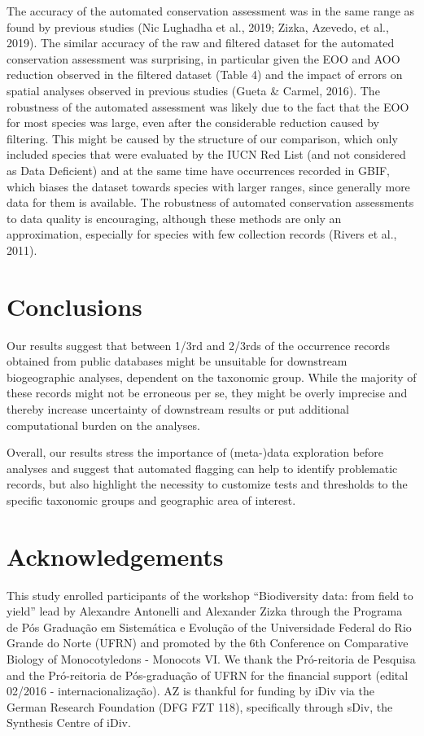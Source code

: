 \documentclass[
  12pt,
]{article}
\begin{document}
The accuracy of the automated conservation assessment was in the same range as found by previous studies (Nic Lughadha et al., 2019; Zizka, Azevedo, et al., 2019). The similar accuracy of the raw and filtered dataset for the automated conservation assessment was surprising, in particular given the EOO and AOO reduction observed in the filtered dataset (Table 4) and the impact of errors on spatial analyses observed in previous studies (Gueta \& Carmel, 2016). The robustness of the automated assessment was likely due to the fact that the EOO for most species was large, even after the considerable reduction caused by filtering. This might be caused by the structure of our comparison, which only included species that were evaluated by the IUCN Red List (and not considered as Data Deficient) and at the same time have occurrences recorded in GBIF, which biases the dataset towards species with larger ranges, since generally more data for them is available. The robustness of automated conservation assessments to data quality is encouraging, although these methods are only an approximation, especially for species with few collection records (Rivers et al., 2011).

\hypertarget{conclusions}{%
\section{Conclusions}\label{conclusions}}

Our results suggest that between 1/3rd and 2/3rds of the occurrence records obtained from public databases might be unsuitable for downstream biogeographic analyses, dependent on the taxonomic group. While the majority of these records might not be erroneous per se, they might be overly imprecise and thereby increase uncertainty of downstream results or put additional computational burden on the analyses.

Overall, our results stress the importance of (meta-)data exploration before analyses and suggest that automated flagging can help to identify problematic records, but also highlight the necessity to customize tests and thresholds to the specific taxonomic groups and geographic area of interest.

\hypertarget{acknowledgements}{%
\section{Acknowledgements}\label{acknowledgements}}

This study enrolled participants of the workshop ``Biodiversity data: from field to yield'' lead by Alexandre Antonelli and Alexander Zizka through the Programa de Pós Graduação em Sistemática e Evolução of the Universidade Federal do Rio Grande do Norte (UFRN) and promoted by the 6th Conference on Comparative Biology of Monocotyledons - Monocots VI. We thank the Pró-reitoria de Pesquisa and the Pró-reitoria de Pós-graduação of UFRN for the financial support (edital 02/2016 - internacionalização). AZ is thankful for funding by iDiv via the German Research Foundation (DFG FZT 118), specifically through sDiv, the Synthesis Centre of iDiv.
\end{document}
